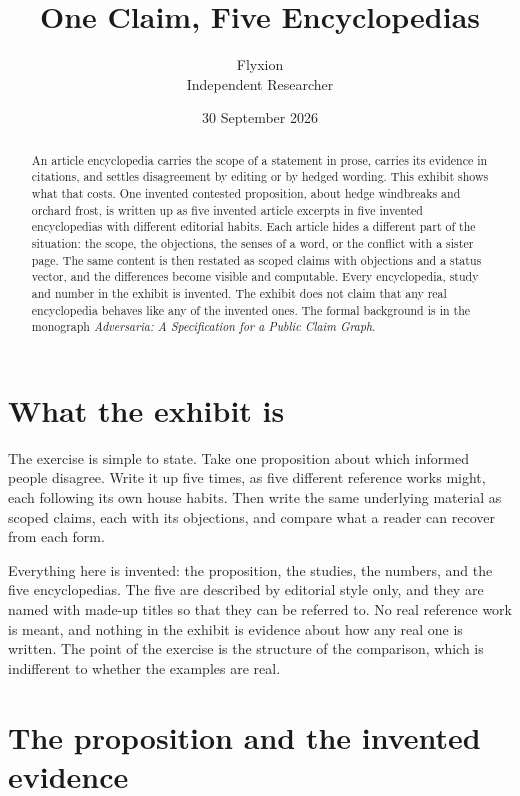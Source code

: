 \documentclass[11pt]{article}
\title{One Claim, Five Encyclopedias}
\author{Flyxion\\\small Independent Researcher}
\date{30 September 2026}
\begin{document}
\maketitle

\begin{abstract}
\noindent
An article encyclopedia carries the scope of a statement in prose, carries its evidence in citations, and settles disagreement by editing or by hedged wording. This exhibit shows what that costs. One invented contested proposition, about hedge windbreaks and orchard frost, is written up as five invented article excerpts in five invented encyclopedias with different editorial habits. Each article hides a different part of the situation: the scope, the objections, the senses of a word, or the conflict with a sister page. The same content is then restated as scoped claims with objections and a status vector, and the differences become visible and computable. Every encyclopedia, study and number in the exhibit is invented. The exhibit does not claim that any real encyclopedia behaves like any of the invented ones. The formal background is in the monograph \emph{Adversaria: A Specification for a Public Claim Graph}.
\end{abstract}

\section{What the exhibit is}

The exercise is simple to state. Take one proposition about which informed people disagree. Write it up five times, as five different reference works might, each following its own house habits. Then write the same underlying material as scoped claims, each with its objections, and compare what a reader can recover from each form.

Everything here is invented: the proposition, the studies, the numbers, and the five encyclopedias. The five are described by editorial style only, and they are named with made-up titles so that they can be referred to. No real reference work is meant, and nothing in the exhibit is evidence about how any real one is written. The point of the exercise is the structure of the comparison, which is indifferent to whether the examples are real.

\section{The proposition and the invented evidence}\label{sec:evidence}
\end{document}
